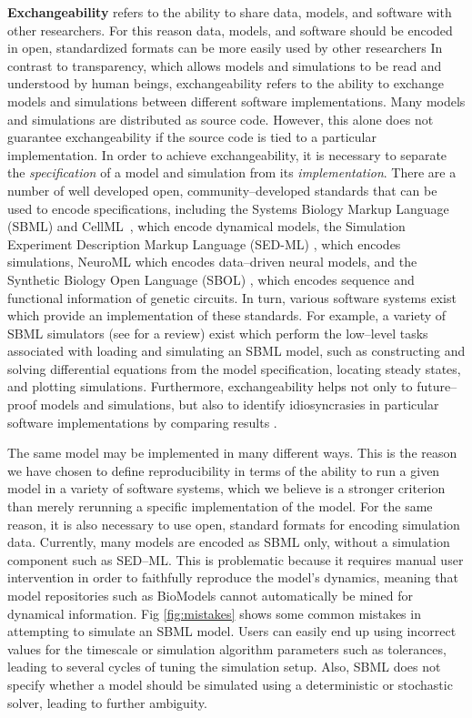 \documentclass[10pt,letterpaper]{article}
\begin{document}
\textbf{Exchangeability} refers to the ability to share data, models, and software with other researchers. For this reason data, models, and software should be encoded in open, standardized formats can be more easily used by other researchers  In contrast to transparency, which allows models and simulations to be read and understood by human beings, exchangeability refers to the ability to exchange models and simulations between different software implementations. Many models and simulations are distributed as source code. However, this alone does not guarantee exchangeability if the source code is tied to a particular implementation. In order to achieve exchangeability, it is necessary to separate the \textit{specification} of a model and simulation from its \textit{implementation}. There are a number of well developed open, community--developed standards that can be used to encode specifications, including the Systems Biology Markup Language (SBML) \cite{hucka2003systems,bornstein2008libsbml} and CellML~\cite{cuellar2003overview}, which encode dynamical models, the Simulation Experiment Description Markup Language (SED-ML) \cite{waltemath2011reproducible}, which encodes simulations, NeuroML \cite{gleeson2010neuroml} which encodes data--driven neural models, and the Synthetic Biology Open Language (SBOL) \cite{bartley2015synthetic,galdzicki2014synthetic}, which encodes sequence and functional information of genetic circuits. In turn, various software systems exist which provide an implementation of these standards. For example, a variety of SBML simulators (see \cite{sauro2008standards} %
for a review) exist which perform the low--level tasks associated with loading and simulating an SBML model, such as constructing and solving differential equations from the model specification, locating steady states, and plotting simulations. Furthermore, exchangeability helps not only to future--proof models and simulations, but also to identify idiosyncrasies in particular software implementations by comparing results \cite{bergmann2008comparing}.

The same model may be implemented in many different ways. This is the reason we have chosen to define reproducibility in terms of the ability to run a given model in a variety of software systems, which we believe is a stronger criterion than merely rerunning a specific implementation of the model. For the same reason, it is also necessary to use open, standard formats for encoding simulation data. Currently, many models are encoded as SBML only, without a simulation component such as SED--ML. This is problematic because it requires manual user intervention in order to faithfully reproduce the model's dynamics, meaning that model repositories such as BioModels \cite{le2006biomodels} cannot automatically be mined for dynamical information. Fig \ref{fig:mistakes} shows some common mistakes in attempting to simulate an SBML model. Users can easily end up using incorrect values for the timescale or simulation algorithm parameters such as tolerances, leading to several cycles of tuning the simulation setup. Also, SBML does not specify whether a model should be simulated using a deterministic or stochastic solver, leading to further ambiguity.
\end{document}
